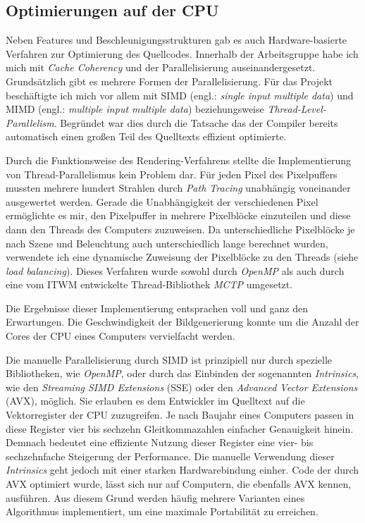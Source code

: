 \documentclass[crop=false]{standalone}
\begin{document}
    \subsection{Optimierungen auf der CPU} %
    \label{sub:optimierungen_auf_cpu}
      Neben Features und Beschleunigungsstrukturen gab es auch Hardware-basierte Verfahren zur Optimierung des Quellcodes.
      Innerhalb der Arbeitsgruppe habe ich mich mit \textit{Cache Coherency} und der Parallelisierung auseinandergesetzt.
      Grundsätzlich gibt es mehrere Formen der Parallelisierung.
      Für das Projekt beschäftigte ich mich vor allem mit SIMD (engl.: \textit{single input multiple data}) und MIMD (engl.: \textit{multiple input multiple data}) beziehungsweise \textit{Thread-Level-Parallelism}.
      Begründet war dies durch die Tatsache das der Compiler bereits automatisch einen großen Teil des Quelltexts effizient optimierte.

      Durch die Funktionsweise des Rendering-Verfahrens stellte die Implementierung von Thread-Parallelismus kein Problem dar.
      Für jeden Pixel des Pixelpuffers mussten mehrere hundert Strahlen durch \textit{Path Tracing} unabhängig voneinander ausgewertet werden.
      Gerade die Unabhängigkeit der verschiedenen Pixel ermöglichte es mir, den Pixelpuffer in mehrere Pixelblöcke einzuteilen und diese dann den Threads des Computers zuzuweisen.
      Da unterschiedliche Pixelblöcke je nach Szene und Beleuchtung auch unterschiedlich lange berechnet wurden, verwendete ich eine dynamische Zuweisung der Pixelblöcke zu den Threads (siehe \textit{load balancing}).
      Dieses Verfahren wurde sowohl durch \textit{OpenMP} als auch durch eine vom ITWM entwickelte Thread-Bibliothek \textit{MCTP} umgesetzt.

      Die Ergebnisse dieser Implementierung entsprachen voll und ganz den Erwartungen.
      Die Geschwindigkeit der Bildgenerierung konnte um die Anzahl der Cores der CPU eines Computers vervielfacht werden.

      Die manuelle Parallelisierung durch SIMD ist prinzipiell nur durch spezielle Bibliotheken, wie \textit{OpenMP}, oder durch das Einbinden der sogenannten \textit{Intrinsics}, wie den \textit{Streaming SIMD Extensions} (SSE) oder den \textit{Advanced Vector Extensions} (AVX),  möglich.
      Sie erlauben es dem Entwickler im Quelltext auf die Vektorregister der CPU zuzugreifen.
      Je nach Baujahr eines Computers passen in diese Register vier bis sechzehn Gleitkommazahlen einfacher Genauigkeit hinein.
      Demnach bedeutet eine effiziente Nutzung dieser Register eine vier- bis sechzehnfache Steigerung der Performance.
      Die manuelle Verwendung dieser \textit{Intrinsics} geht jedoch mit einer starken Hardwarebindung einher.
      Code der durch AVX optimiert wurde, lässt sich nur auf Computern, die ebenfalls AVX kennen, ausführen.
      Aus diesem Grund werden häufig mehrere Varianten eines Algorithmus implementiert, um eine maximale Portabilität zu erreichen.
\end{document}
